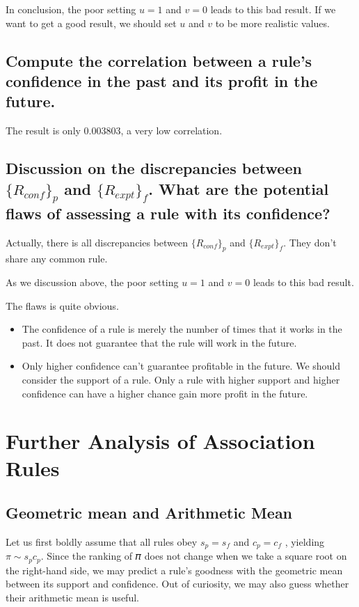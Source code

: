 \documentclass[runningheads]{llncs}
\begin{document}
In conclusion, the poor setting $u=1$ and $v=0$ leads to this bad result. If we want to get a good result, we should set $u$ and $v$ to be more realistic values.

\subsection*{Compute the correlation between a rule's confidence in the past and its
    profit in the future.}

The result is only $0.003803$, a very low correlation.

\subsection*{Discussion on the discrepancies between $\{R_{conf}\}_p$ and $\{R_{expt}\}_f$. What are the
    potential flaws of assessing a rule with its confidence?
}

Actually, there is all discrepancies between $\{R_{conf}\}_p$ and $\{R_{expt}\}_f$. They don't share any common rule.

As we discussion above, the poor setting $u=1$ and $v=0$ leads to this bad result.

The flaws is quite obvious.

\begin{itemize}
    \item The confidence of a rule is merely the number of times that it works in the past. It does not guarantee that the rule will work in the future.
    \item Only higher confidence can't guarantee profitable in the future. We should consider the support of a rule. Only a rule with higher support and higher confidence can have a higher chance gain more profit in the future.
\end{itemize}

\section{Further Analysis of Association Rules}

\subsection{Geometric mean and Arithmetic Mean}
Let us first boldly assume that all rules obey $s_p= s_f$ and $c_p= c_f$ , yielding $\pi\sim s_pc_p$. Since the ranking of 𝜋 does not change when we take a square root on the right-hand side, we may predict a rule’s goodness with the geometric mean between its support and confidence. Out of curiosity, we may also guess whether their arithmetic mean is useful.
\end{document}
